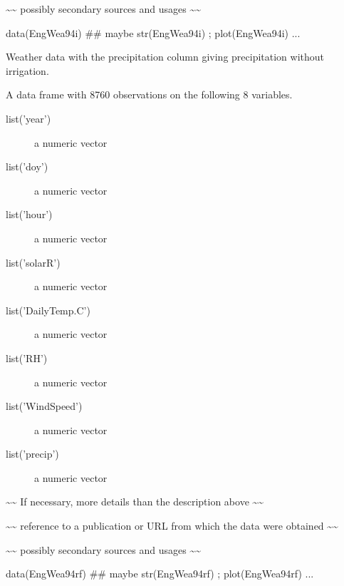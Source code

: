 \documentclass[letterpaper]{book}
\begin{document}
%
\begin{References}\relax
\textasciitilde{}\textasciitilde{} possibly secondary sources and usages \textasciitilde{}\textasciitilde{}
\end{References}
%
\begin{Examples}
\begin{ExampleCode}
data(EngWea94i)
## maybe str(EngWea94i) ; plot(EngWea94i) ...
\end{ExampleCode}
\end{Examples}
%
\begin{Description}\relax
Weather data with the precipitation column giving
precipitation without irrigation.
\end{Description}
%
\begin{Format}
A data frame with 8760 observations on the following 8 variables.
\begin{description}
 \item[list('year')] a numeric vector\item[list('doy')] a
numeric vector\item[list('hour')] a numeric vector
\item[list('solarR')] a numeric vector\item[list('DailyTemp.C')] a
numeric vector\item[list('RH')] a numeric vector
\item[list('WindSpeed')] a numeric vector\item[list('precip')] a numeric
vector
\end{description}
\end{Format}
%
\begin{Details}\relax
\textasciitilde{}\textasciitilde{} If necessary, more details than the description above \textasciitilde{}\textasciitilde{}
\end{Details}
%
\begin{Source}\relax
\textasciitilde{}\textasciitilde{} reference to a publication or URL from which the data
were obtained \textasciitilde{}\textasciitilde{}
\end{Source}
%
\begin{References}\relax
\textasciitilde{}\textasciitilde{} possibly secondary sources and usages \textasciitilde{}\textasciitilde{}
\end{References}
%
\begin{Examples}
\begin{ExampleCode}
data(EngWea94rf)
## maybe str(EngWea94rf) ; plot(EngWea94rf) ...
\end{ExampleCode}
\end{Examples}
\end{document}
